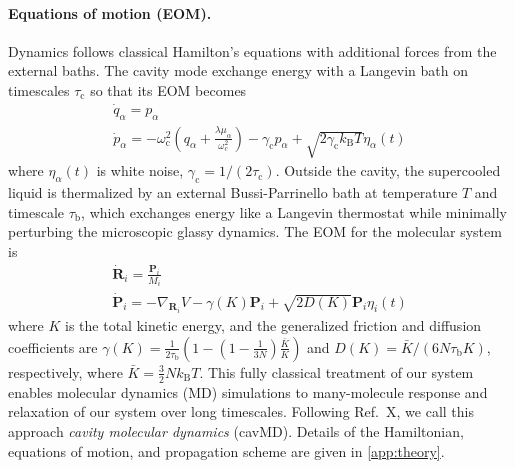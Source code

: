 \documentclass[%
 reprint,
 amsmath,amssymb,
 aps,
]{revtex4-2}
\begin{document}
\paragraph*{Equations of motion (EOM).} 
Dynamics follows classical Hamilton's equations with additional forces from the external baths.
The cavity mode exchange energy with a Langevin bath on timescales $\tau_\mathrm{c}$ so that its EOM becomes
\begin{gather}
\dot{q}_{\alpha} = p_\alpha \\
\dot{p}_\alpha = -\omega_\mathrm{c}^2 \left(q_\alpha + \frac{\lambda \mu_\alpha}{\omega_c^2} \right) -\gamma_\mathrm{c} p_\alpha +\sqrt{2 \gamma_\mathrm{c} k_\mathrm{B} T } \eta_\alpha(t)
\end{gather}
where $\eta_\alpha(t)$ is white noise, $\gamma_\mathrm{c} = 1/(2\tau_\mathrm{c})$. 
Outside the cavity, the supercooled liquid is thermalized by an external Bussi-Parrinello bath at temperature $T$ and timescale $\tau_\mathrm{b}$, which exchanges energy like a Langevin thermostat while minimally perturbing the microscopic glassy dynamics. The EOM for the molecular system is 
\begin{gather}
\dot{\bm{R}}_i = \frac{\bm{P}_i}{M_i} \\
\dot{\bm{P}}_i = -\nabla_{\bm{R}_i} V -\gamma(K) \bm P_i + \sqrt{2 D(K)} \bm P_i \eta_i (t)
\end{gather}
where $K$ is the total kinetic energy, and the generalized friction and diffusion coefficients are $\gamma(K) = \frac{1}{2\tau_\mathrm{b}} \left(1-\left(1-\frac{1}{3 N}\right) \frac{\bar{K}}{K}\right)$ and $ D (K) = \bar{K} / (6 N \tau _\mathrm{b} K)$, respectively, where $\bar{K} = \frac{3}{2}Nk_\mathrm{B} T$. This fully classical treatment of our system enables molecular dynamics (MD) simulations to many-molecule response and relaxation of our system over long timescales. 
Following Ref.~X, we call this approach \textit{cavity molecular dynamics} (cavMD). Details of the Hamiltonian, equations of motion, and propagation scheme are given in \cref{app:theory}.
\end{document}
